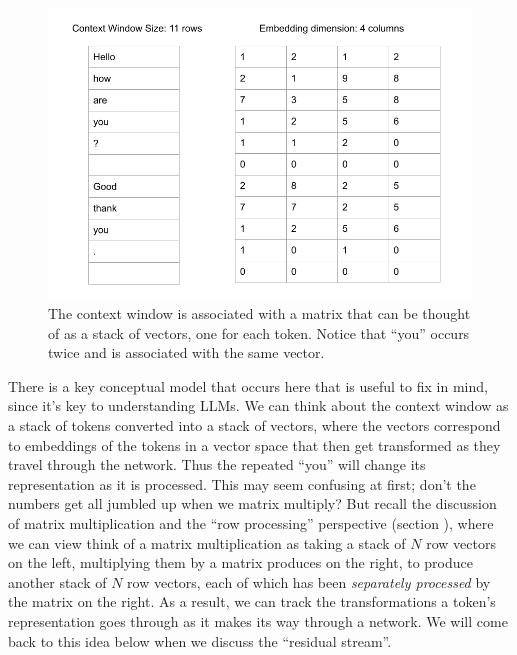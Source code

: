 \begin{figure}[h]
\centering
\includegraphics[scale=.45]{./images/contextWindowAsStack.png}
\caption[Jeff Yoshimi]{The context window is associated with a matrix that can be thought of as a stack of vectors, one for each token. Notice that ``you'' occurs twice and is associated with the same vector.}
\label{nextWordPrediction}
\end{figure}

There is a key conceptual model that occurs here that is useful to fix in mind, since it's key to understanding LLMs. We can think about the context window as a stack of tokens converted into a stack of vectors, where the vectors correspond to embeddings of the tokens in a vector space that then get transformed as they travel through the network. Thus the repeated ``you'' will change its representation as it is processed. This may seem confusing at first; don't the numbers get all jumbled up when we matrix multiply? But recall the discussion of matrix multiplication and the ``row processing'' perspective (section ), where we can view think of a matrix multiplication as taking a stack of $N$ row vectors on the left, multiplying them by a matrix produces on the right, to produce another stack of $N$ row vectors, each of which has been \emph{separately processed} by the matrix on the right. As a result, we can track the transformations a token's representation goes through as it makes its way through a network.  We will come back to this idea below when we discuss the ``residual stream''. 


